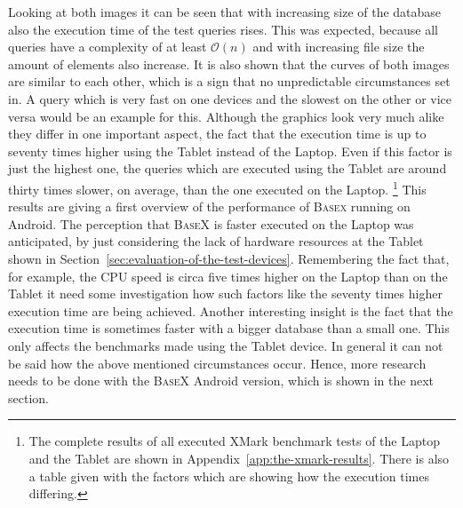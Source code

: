 Looking at both images it can be seen that with increasing size of the database also the execution time of the test queries rises.
This was expected, because all queries have a complexity of at least $\mathcal O(n)$ and with increasing file size the amount of elements also increase.
It is also shown that the curves of both images are similar to each other, which is a sign that no unpredictable circumstances set in.
A query which is very fast on one devices and the slowest on the other or vice versa would be an example for this.
Although the graphics look very much alike they differ in one important aspect, the fact that the execution time is up to seventy times higher using the Tablet instead of the Laptop.
Even if this factor is just the highest one, the queries which are executed using the Tablet are around thirty times slower, on average, than the one executed on the Laptop.
\footnote{The complete results of all executed XMark benchmark tests of the Laptop and the Tablet are shown in Appendix~\ref{app:the-xmark-results}. There is also a table given with the factors which are showing how the execution times differing.}
This results are giving a first overview of the performance of \textsc{Basex} running on Android.
The perception that \textsc{BaseX} is faster executed on the Laptop was anticipated, by just considering the lack of hardware resources at the Tablet shown in Section~\ref{sec:evaluation-of-the-test-devices}.
Remembering the fact that, for example, the CPU speed is circa five times higher on the Laptop than on the Tablet it need some investigation how such factors like the seventy times higher execution time are being achieved.
Another interesting insight is the fact that the execution time is sometimes faster with a bigger database than a small one.
This only affects the benchmarks made using the Tablet device.
In general it can not be said how the above mentioned circumstances occur.
Hence, more research needs to be done with the \textsc{BaseX} Android version, which is shown in the next section.

